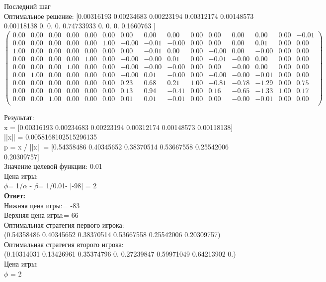 \documentclass{article}
\begin{document}
\begin{flushleft}
    Последний шаг \\
    Оптимальное решение: 
    [0.00316193 0.00234683 0.00223194 0.00312174 0.00148573 0.00118138
 0.         0.         0.         0.74733933 0.         0.
 0.         0.1660763 ]
\begin{equation*}
\begin{pmatrix}
 0.00 & 0.00 & 0.00 & 0.00 & 0.00 & 0.00 &  0.00 &  0.00 &  0.00 & 0.00 &  0.00 &  0.00 &  0.00 & 0.00 & -0.01 \\
 0.00 & 0.00 & 0.00 & 0.00 & 0.00 & 1.00 & -0.00 & -0.01 & -0.00 & 0.00 &  0.00 &  0.00 &  0.01 & 0.00 &  0.00 \\
 1.00 & 0.00 & 0.00 & 0.00 & 0.00 & 0.00 &  0.00 & -0.01 &  0.00 & 0.00 & -0.00 &  0.00 & -0.00 & 0.00 &  0.00 \\
 0.00 & 0.00 & 0.00 & 0.00 & 1.00 & 0.00 & -0.00 & -0.00 &  0.01 & 0.00 & -0.01 & -0.00 &  0.00 & 0.00 &  0.00 \\
 0.00 & 0.00 & 0.00 & 1.00 & 0.00 & 0.00 & -0.00 & -0.00 & -0.00 & 0.00 &  0.00 & -0.00 &  0.00 & 0.00 &  0.00 \\
 0.00 & 1.00 & 0.00 & 0.00 & 0.00 & 0.00 & -0.00 &  0.01 & -0.00 & 0.00 & -0.00 & -0.00 & -0.01 & 0.00 &  0.00 \\
 0.00 & 0.00 & 0.00 & 0.00 & 0.00 & 0.00 &  0.23 &  0.68 &  0.21 & 1.00 & -0.81 & -0.78 & -1.29 & 0.00 &  0.75 \\
 0.00 & 0.00 & 0.00 & 0.00 & 0.00 & 0.00 &  0.13 &  0.94 & -0.41 & 0.00 &  0.16 & -0.65 & -1.33 & 1.00 &  0.17 \\
 0.00 & 0.00 & 1.00 & 0.00 & 0.00 & 0.00 &  0.01 &  0.01 & -0.01 & 0.00 &  0.00 & -0.00 & -0.01 & 0.00 &  0.00 \\
\end{pmatrix}
\end{equation*}
\end{flushleft}

Результат: \\
x = [0.00316193 0.00234683 0.00223194 0.00312174 0.00148573 0.00118138] \\
||x|| = 0.0058168102515296135\\
p = x / ||x|| =  [0.54358486 0.40345652 0.38370514 0.53667558 0.25542006 0.20309757] \\
Значение целевой функции: 0.01 \\
Цена игры: \\
$\phi$=  1/$\alpha$ - $\beta$=  1/0.01- |-98| = 2\\

\textbf{Ответ:} \\
	Нижняя цена игры:= -83 \\ 
	Верхняя цена игры:= 66 \\
Оптимальная стратегия первого игрока: \\
(0.54358486 0.40345652 0.38370514 0.53667558 0.25542006 0.20309757) \\
Оптимальная стратегия второго игрока: \\
   (0.10314031 0.13426961 0.35374796 0. 0.27239847 0.59971049 0.64213902 0.) \\
Цена игры: \\
$\phi$ = 2 \\
\end{document}
